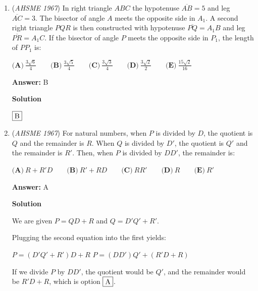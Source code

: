 \begin{enumerate}
 Since the area of the first circle is $\frac{\pi}{4}$, and the common ratio of areas is $\frac{1}{2}$, the sum of all the areas of the circles is the sum of the infinite geometric sequence, which is $\frac{A_1}{1 - r} = \frac{\frac{\pi}{4}}{1 - \frac{1}{2}} = \frac{\pi}{2}$.  This is for side length $m=1$, and as noted before, there should be an $m^2$ factor in addition to this number to generalize it from the unit square.  This gives answer $\fbox{A}$.

 


	\item (\textit{AHSME 1967}) In right triangle $ABC$ the hypotenuse $\overline{AB}=5$ and leg $\overline{AC}=3$.  The bisector of angle $A$ meets the opposite side in $A_1$.  A second right triangle $PQR$ is then constructed with hypotenuse $\overline{PQ}=A_1B$ and leg $\overline{PR}=A_1C$.  If the bisector of angle $P$ meets the opposite side in $P_1$, the length of $PP_1$ is:


 $\textbf{(A)}\ \frac{3\sqrt{6}}{4}\qquad \textbf{(B)}\ \frac{3\sqrt{5}}{4}\qquad \textbf{(C)}\ \frac{3\sqrt{3}}{4}\qquad \textbf{(D)}\ \frac{3\sqrt{2}}{2}\qquad \textbf{(E)}\ \frac{15\sqrt{2}}{16}$

 \textbf{Answer: }B



\textbf{Solution}

$\fbox{B}$



	\item (\textit{AHSME 1967}) For natural numbers, when $P$ is divided by $D$, the quotient is $Q$ and the remainder is $R$.  When $Q$ is divided by $D'$, the quotient is $Q'$ and the remainder is $R'$.  Then, when $P$ is divided by $DD'$, the remainder is:


 $\textbf{(A)}\ R+R'D\qquad \textbf{(B)}\ R'+RD\qquad \textbf{(C)}\ RR'\qquad \textbf{(D)}\ R\qquad \textbf{(E)}\ R'$

 \textbf{Answer: }A



\textbf{Solution}

We are given $P = QD + R$ and $Q = D'Q' + R'$.

 Plugging the second equation into the first yields:

 $P = (D'Q' + R')D + R$
$P = (DD')Q' + (R'D + R)$

 If we divide $P$ by $DD'$, the quotient would be $Q'$, and the remainder would be $R'D + R$, which is option $\fbox{A}$.

 



\end{enumerate}
